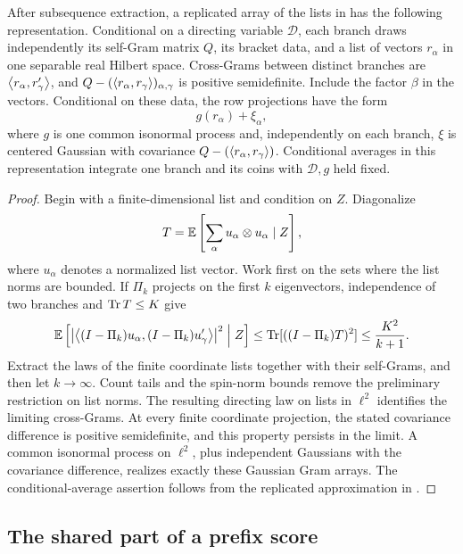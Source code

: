 \begin{lemma}
\label{lem:row-hilbert-representation}
After subsequence extraction, a replicated array of the lists in
 has the following representation.  Conditional
on a directing variable $\mathcal D$, each branch draws independently
its self-Gram matrix $Q$, its bracket data, and a list of vectors
$r_\alpha$ in one separable real Hilbert space.  Cross-Grams between
distinct branches are $\left\langle r_\alpha,r'_\gamma\right\rangle$, and
$Q-(\left\langle r_\alpha,r_\gamma\right\rangle)_{\alpha,\gamma}$ is positive
semidefinite.  Include the factor $\beta$ in the vectors.  Conditional
on these data, the row projections have the form
\begin{equation}
 g(r_\alpha)+\xi_\alpha,
 \label{eq:row-shared-private}
\end{equation}
where $g$ is one common isonormal process and, independently on each
branch, $\xi$ is centered Gaussian with covariance
$Q-(\left\langle r_\alpha,r_\gamma\right\rangle)$.  Conditional averages in this
representation integrate one branch and its coins with $\mathcal D,g$
held fixed.
\end{lemma}

\begin{proof}
Begin with a finite-dimensional list and condition on $Z$.
Diagonalize
\[
 T=\mathbb E\left[\sum_\alpha u_\alpha\otimes u_\alpha\mid Z\right],
\]
where $u_\alpha$ denotes a normalized list vector.  Work first on the
sets where the list norms are bounded.  If $\Pi_k$ projects on the first
$k$ eigenvectors, independence of two branches and
$\operatorname{Tr} T\le K$ give
\[
 \mathbb E\left[\left|\left\langle (I-\Pi_k)u_\alpha,(I-\Pi_k)u'_\gamma\right\rangle\right|^2\Bigm|Z\right]
       \le\operatorname{Tr}[((I-\Pi_k)T)^2]\le\frac{K^2}{k+1}.
\]
Extract the laws of the finite coordinate lists together with their
self-Grams, and then let $k\to\infty$.  Count tails and the spin-norm
bounds remove the preliminary restriction on list norms.  The resulting
directing law on lists in $\ell^2$ identifies the limiting cross-Grams.
At every finite coordinate projection, the stated covariance difference
is positive semidefinite, and this property persists in the limit.  A common isonormal
process on $\ell^2$, plus independent Gaussians with the covariance
difference, realizes exactly these Gaussian Gram arrays.  The
conditional-average assertion follows from the replicated
approximation in .
\end{proof}

\subsection{The shared part of a prefix score}


